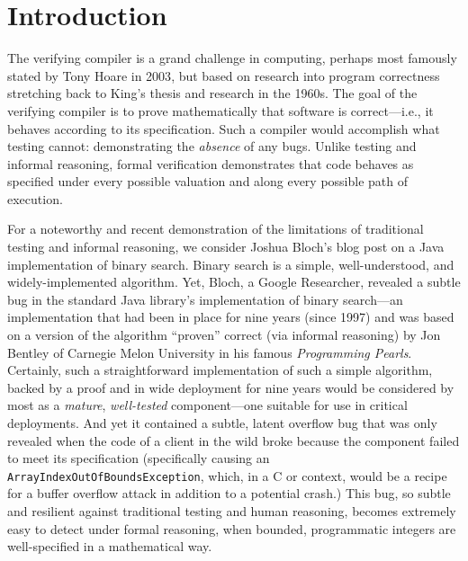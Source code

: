 \chapter{Introduction}\label{ch:introduction}
The verifying compiler is a grand challenge in computing, perhaps most famously stated by Tony Hoare in 2003\cite{hoareGrandChallenge}, but based on research into program correctness stretching back to King's thesis\cite{kingVerifier} and research in the 1960s\cite{hoareAxiomaticProgramming}.  The goal of the verifying compiler is to prove mathematically that software is correct---i.e., it behaves according to its specification.  Such a compiler would accomplish what testing cannot: demonstrating the \emph{absence} of any bugs.  Unlike testing and informal reasoning, formal verification demonstrates that code behaves as specified under every possible valuation and along every possible path of execution.

For a noteworthy and recent demonstration of the limitations of traditional testing and informal reasoning, we consider Joshua Bloch's blog post on a Java implementation of binary search\cite{blochBinarySearch}.  Binary search is a simple, well-understood, and widely-implemented algorithm.  Yet, Bloch, a Google Researcher, revealed a subtle bug in the standard Java library's implementation of binary search---an implementation that had been in place for nine years (since 1997) and was based on a version of the algorithm ``proven'' correct (via informal reasoning) by Jon Bentley of Carnegie Melon University in his famous \emph{Programming Pearls}\cite{bentleyProgrammingPearls}.  Certainly, such a straightforward implementation of such a simple algorithm, backed by a proof and in wide deployment for nine years would be considered by most as a \emph{mature}, \emph{well-tested} component---one suitable for use in critical deployments.  And yet it contained a subtle, latent overflow bug that was only revealed when the code of a client in the wild broke because the component failed to meet its specification (specifically causing an \texttt{ArrayIndexOutOfBoundsException}, which, in a C or \cplusplus context, would be a recipe for a buffer overflow attack in addition to a potential crash.)  This bug, so subtle and resilient against traditional testing and human reasoning, becomes extremely easy to detect under formal reasoning, when bounded, programmatic integers are well-specified in a mathematical way.

